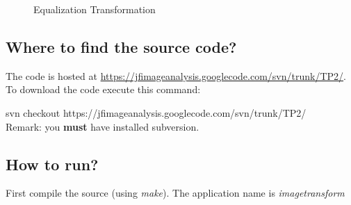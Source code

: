 \documentclass{article}
\begin{document}
	\begin{figure}[H]
	\centering
	\caption{Equalization Transformation}
	\label{fig:equalizing}
	\end{figure}


	\subsection{Where to find the source code?}

	The code is hosted at \url{https://jfimageanalysis.googlecode.com/svn/trunk/TP2/}. 
	To download the code execute this command:
	
	svn checkout https://jfimageanalysis.googlecode.com/svn/trunk/TP2/
	\\Remark: you {\bf must} have installed subversion. 
	
	\subsection{How to run?}
	First compile the source (using {\it make}). The application name is {\it imagetransform} 
	
\end{document}
